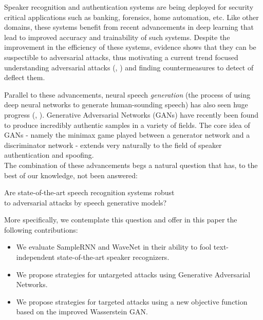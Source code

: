 Speaker recognition and authentication systems are being deployed for security
critical applications such as banking, forensics, home automation, etc. Like
other domains, these systems benefit from recent advancements in deep
learning that lead to improved accuracy and trainability of such systems.
Despite the improvement in the efficiency of these systems, evidence shows that
they can be suspectible to adversarial attacks\cite{wu2015spoofing}, thus motivating a current trend
focused understanding adversarial attacks (\cite{szegedy2013intriguing}, \cite{goodfellow2014explaining}) and finding countermeasures to detect of deflect them. 

Parallel to these advancements, neural speech \textit{generation} (the process of using deep neural networks to generate human-sounding speech) has also seen huge progress (\cite{wang2017tacotron}, \cite{arik2017deep}). Generative Adversarial Networks (GANs) have recently been found to produce incredibly  authentic samples in a variety of fields. The core idea of GANs - namely the minimax game played between a generator network and a discriminator network - extends very naturally to the field of speaker authentication and spoofing. \\
The combination of these advancements begs a natural question that has, to the
best of our knowledge, not been answered:
\begin{center}
Are state-of-the-art speech recognition systems robust \\to adversarial attacks by speech generative models?
\end{center}

More specifically, we contemplate this question and offer in this paper the following contributions:
\begin{itemize}
\item We evaluate SampleRNN and WaveNet in their ability to fool text-independent state-of-the-art speaker recognizers.
\item We propose strategies for untargeted attacks using Generative Adversarial Networks.
\item We propose strategies for targeted attacks using a new objective function based on the improved Wasserstein GAN.
\end{itemize}
